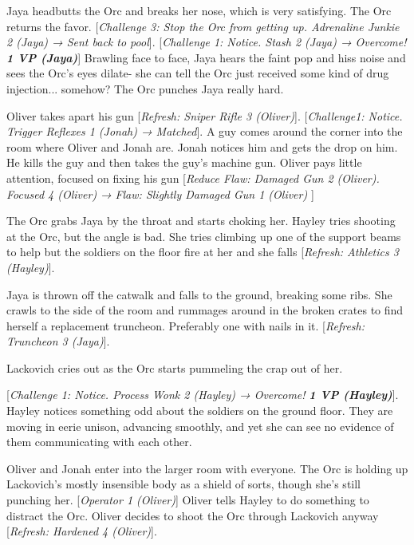 Jaya headbutts the Orc and breaks her nose, which is very satisfying.  The Orc returns the favor.  {[}\textit{Challenge 3: Stop the Orc from getting up.  Adrenaline Junkie 2 (Jaya) → Sent back to pool}{]}.  {[}\textit{Challenge 1: Notice.  Stash 2 (Jaya)  → Overcome! }\textit{\textbf{1 VP (Jaya)}}{]}  Brawling face to face, Jaya hears the faint pop and hiss noise and sees the Orc's eyes dilate- she can tell the Orc just received some kind of drug injection... somehow?  The Orc punches Jaya really hard.



Oliver takes apart his gun {[}\textit{Refresh: Sniper Rifle 3 (Oliver)}{]}.   {[}\textit{Challenge1:  Notice.  Trigger Reflexes 1 (Jonah) → Matched}{]}.  A guy comes around the corner into the room where Oliver and Jonah are. Jonah notices him and gets the drop on him.  He kills the guy and then takes the guy's machine gun.  Oliver pays little attention, focused on fixing his gun {[}\textit{Reduce Flaw: Damaged Gun 2 (Oliver).  Focused 4 (Oliver) → }\textit{ {\color[RGB]{255,0,0}Flaw: Slightly Damaged Gun 1 (Oliver)} }{]}



The Orc grabs Jaya by the throat and starts choking her.  Hayley tries shooting at the Orc, but the angle is bad.  She tries climbing up one of the support beams to help but the soldiers on the floor fire at her and she falls {[}\textit{Refresh: Athletics 3 (Hayley)}{]}.  



Jaya is thrown off the catwalk and falls to the ground, breaking some ribs.  She crawls to the side of the room and rummages around in the broken crates to find herself a replacement truncheon.  Preferably one with nails in it.  {[}\textit{Refresh: Truncheon 3 (Jaya)}{]}. 



Lackovich cries out as the Orc starts pummeling the crap out of her.



{[}\textit{Challenge 1: Notice.  Process Wonk 2 (Hayley)  → Overcome! }\textit{\textbf{1 VP (Hayley)}}{]}.  Hayley notices something odd about the soldiers on the ground floor.  They are moving in eerie unison, advancing smoothly, and yet she can see no evidence of them communicating with each other.



Oliver and Jonah enter into the larger room with everyone.  The Orc is holding up Lackovich's mostly insensible body as a shield of sorts, though she's still punching her.  {[}\textit{Operator 1 (Oliver)}{]} Oliver tells Hayley to do something to distract the Orc.  Oliver decides to shoot the Orc through Lackovich anyway {[}\textit{Refresh: Hardened 4 (Oliver)}{]}.




